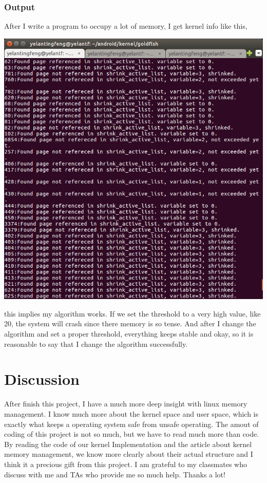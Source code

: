 \documentclass[12pt,a4paper,UTF8]{article}
\theoremstyle{definition}
\numberwithin{equation}{section}
\numberwithin{figure}{section}
\begin{document}
\subsubsection{Output}
After I write a program to occupy a lot of memory, I get kernel info like this,
\begin{center}
  \includegraphics[scale=0.7]{pgreplace.png}
\end{center}
this implies my algorithm works. If we set the threshold to a very high value, like 20, the system will crash since there memory is so tense. And after I change the algorithm and set a proper threshold, everything keeps stable and okay, so it is reasonable to say that I change the algorithm successfully.
\newpage

\section{Discussion}
    After finish this project, I have a much more deep insight with linux memory management. I know much more about the kernel space and user space, which is exactly what keeps a operating system safe from unsafe operating. The amout of coding of this project is not so much, but we have to read much more than code. By reading the code of our kernel Implementation and the article about kernel memory management, we know more clearly about their actual structure and I think it a precious gift from this project. I am grateful to my classmates who discuss with me and TAs who provide me so much help. Thanks a lot!
\end{document}

